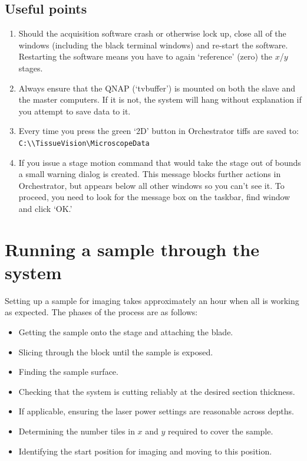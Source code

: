 \documentclass[paper=a4, fontsize=11pt]{scrartcl} %
\numberwithin{equation}{section} %
\numberwithin{figure}{section} %
\numberwithin{table}{section} %
\begin{document}
\subsection{Useful points}
\begin{enumerate}
\item Should the acquisition software crash or otherwise lock up, close all of the windows (including the black terminal windows) and re-start the software.
Restarting the software means you have to again `reference' (zero) the $x$/$y$ stages.
\item Always ensure that the QNAP (`tvbuffer') is mounted on both the slave and the master computers. 
If it is not, the system will hang without explanation if you attempt to save data to it.
\item Every time you press the green `2D' button in Orchestrator tiffs are saved to:\\
\texttt{C:\textbackslash \textbackslash TissueVision\textbackslash MicroscopeData}  
\item If you issue a stage motion command that would take the stage out of bounds a small warning dialog is created. 
This message blocks further actions in Orchestrator, but appears below all other windows so you can't see it.
To proceed, you need to look for the message box on the taskbar, find window and click `OK.' 
\end{enumerate}

\section{Running a sample through the system}
Setting up a sample for imaging takes approximately an hour when all is working as expected. 
The phases of the process are as follows:

\begin{itemize}
\setlength\itemsep{0.01em}
\item Getting the sample onto the stage and attaching the blade.
\item Slicing through the block until the sample is exposed.
\item Finding the sample surface.
\item Checking that the system is cutting reliably at the desired section thickness. 
\item If applicable, ensuring the laser power settings are reasonable across depths. 
\item Determining the number tiles in $x$ and $y$ required to cover the sample. 
\item Identifying the start position for imaging and moving to this position. 
\end{itemize}
\end{document}
